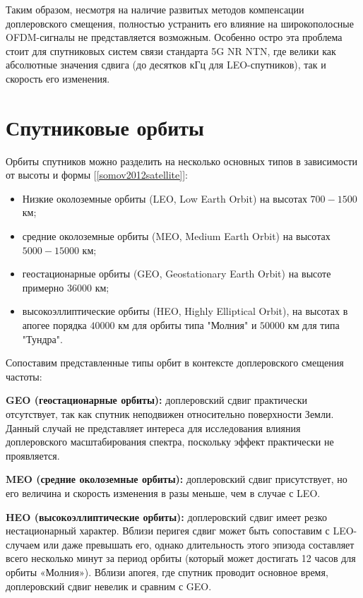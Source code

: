 Таким образом, несмотря на наличие развитых методов компенсации доплеровского смещения,
полностью устранить его влияние на широкополосные OFDM-сигналы не представляется возможным.
Особенно остро эта проблема стоит для спутниковых систем связи стандарта 5G NR NTN, 
где велики как абсолютные значения сдвига (до десятков кГц для LEO-спутников), 
так и скорость его изменения. 


\section{Спутниковые орбиты}

Орбиты спутников можно разделить на несколько основных типов в зависимости от высоты и формы [\ref{somov2012satellite}]:
\begin{itemize}
    \item Низкие околоземные орбиты (LEO, Low Earth Orbit) на высотах $700 - 1500$ км;
    \item средние околоземные орбиты (MEO, Medium Earth Orbit) на высотах $5000 - 15000$ км; 
    \item геостационарные орбиты (GEO, Geostationary Earth Orbit) на высоте примерно $36000$ км;
    \item высокоэллиптические орбиты (HEO, Highly Elliptical Orbit), на высотах в апогее порядка $40000$ км для 
    орбиты типа "Молния" и $50000$ км для типа "Тундра".
\end{itemize}

Сопоставим представленные типы орбит в контексте доплеровского смещения частоты:

\textbf{GEO (геостационарные орбиты):} 
доплеровский сдвиг практически отсутствует, так как спутник неподвижен относительно поверхности Земли.
Данный случай не представляет интереса для исследования влияния доплеровского масштабирования спектра,
поскольку эффект практически не проявляется.

\textbf{MEO (средние околоземные орбиты):} доплеровский сдвиг присутствует,
но его величина и скорость изменения в разы меньше, чем в случае с LEO.

\textbf{HEO (высокоэллиптические орбиты):} доплеровский сдвиг имеет резко нестационарный характер. 
Вблизи перигея сдвиг может быть сопоставим с LEO-случаем или даже превышать его, 
однако длительность этого эпизода составляет всего несколько минут за период орбиты 
(который может достигать 12 часов для орбиты «Молния»). Вблизи апогея, где спутник проводит 
основное время, доплеровский сдвиг невелик и сравним с GEO.

